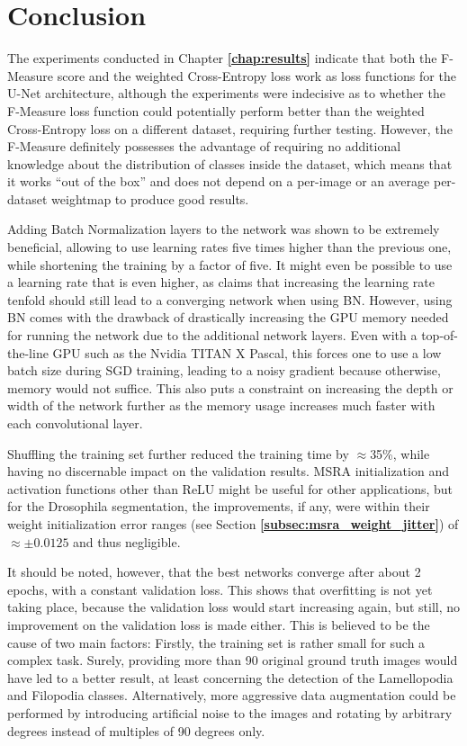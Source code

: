 \chapter {Conclusion}
\label{chap:conclusion}

The experiments conducted in Chapter \textbf{\ref{chap:results}} indicate that both the F-Measure score and the weighted Cross-Entropy loss work as loss functions for the U-Net architecture, although the experiments were indecisive as to whether the F-Measure loss function could potentially perform better than the weighted Cross-Entropy loss on a different dataset, requiring further testing. However, the F-Measure definitely possesses the advantage of requiring no additional knowledge about the distribution of classes inside the dataset, which means that it works ``out of the box'' and does not depend on a per-image or an average per-dataset weightmap to produce good results.

Adding Batch Normalization layers to the network was shown to be extremely beneficial, allowing to use learning rates five times higher than the previous one, while shortening the training by a factor of five. It might even be possible to use a learning rate that is even higher, as \cite{batchnorm} claims that increasing the learning rate tenfold should still lead to a converging network when using BN. However, using BN comes with the drawback of drastically increasing the GPU memory needed for running the network due to the additional network layers. Even with a top-of-the-line GPU such as the Nvidia TITAN X Pascal, this forces one to use a low batch size during SGD training, leading to a noisy gradient because otherwise, memory would not suffice. This also puts a constraint on increasing the depth or width of the network further as the memory usage increases much faster with each convolutional layer.

Shuffling the training set further reduced the training time by $\approx$35\%, while having no discernable impact on the validation results. MSRA initialization and activation functions other than ReLU might be useful for other applications, but for the Drosophila segmentation, the improvements, if any, were within their weight initialization error ranges (see Section \textbf{\ref{subsec:msra_weight_jitter}}) of $\approx\pm0.0125$  and thus negligible.

It should be noted, however, that the best networks converge after about 2 epochs, with a constant validation loss. This shows that overfitting is not yet taking place, because the validation loss would start increasing again, but still, no improvement on the validation loss is made either. This is believed to be the cause of two main factors: Firstly, the training set is rather small for such a complex task. Surely, providing more than 90 original ground truth images would have led to a better result, at least concerning the detection of the Lamellopodia and Filopodia classes. Alternatively, more aggressive data augmentation could be performed by introducing artificial noise to the images and rotating by arbitrary degrees instead of multiples of 90 degrees only.

